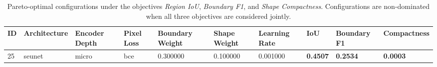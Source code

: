 \begin{table}
\caption{Pareto-optimal configurations under the objectives \textit{Region IoU}, \textit{Boundary F1}, and \textit{Shape Compactness}. Configurations are non-dominated when all three objectives are considered jointly.}
\label{tab:pareto_front}
\begin{tabular}{llllllllll}
\toprule
ID & Architecture & Encoder Depth & Pixel Loss & Boundary Weight & Shape Weight & Learning Rate & IoU & Boundary F1 & Compactness \\
\midrule
25 & seunet & micro & bce & 0.300000 & 0.100000 & 0.001000 & \textbf{0.4507} & \textbf{0.2534} & \textbf{0.0003} \\
\bottomrule
\end{tabular}
\end{table}

